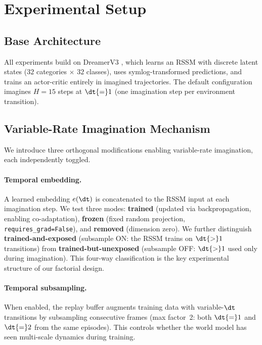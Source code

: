 \section{Experimental Setup}
\label{sec:methodology}

\subsection{Base Architecture}
\label{sec:base_arch}

All experiments build on DreamerV3 \citep{hafner2025dreamerv3}, which learns an RSSM with discrete latent states ($32$ categories $\times$ $32$ classes), uses symlog-transformed predictions, and trains an actor-critic entirely in imagined trajectories. The default configuration imagines $H{=}15$ steps at $\dt{=}1$ (one imagination step per environment transition).

\subsection{Variable-Rate Imagination Mechanism}
\label{sec:variable_rate}

We introduce three orthogonal modifications enabling variable-rate imagination, each independently toggled.

\paragraph{Temporal embedding.}
A learned embedding $e(\dt)$ is concatenated to the RSSM input at each imagination step. We test three modes: \textbf{trained} (updated via backpropagation, enabling co-adaptation), \textbf{frozen} (fixed random projection, \texttt{requires\_grad=False}), and \textbf{removed} (dimension zero). We further distinguish \textbf{trained-and-exposed} (subsample ON: the RSSM trains on $\dt{>}1$ transitions) from \textbf{trained-but-unexposed} (subsample OFF: $\dt{>}1$ used only during imagination). This four-way classification is the key experimental structure of our factorial design.

\paragraph{Temporal subsampling.}
When enabled, the replay buffer augments training data with variable-$\dt$ transitions by subsampling consecutive frames (max factor~2: both $\dt{=}1$ and $\dt{=}2$ from the same episodes). This controls whether the world model has seen multi-scale dynamics during training.

